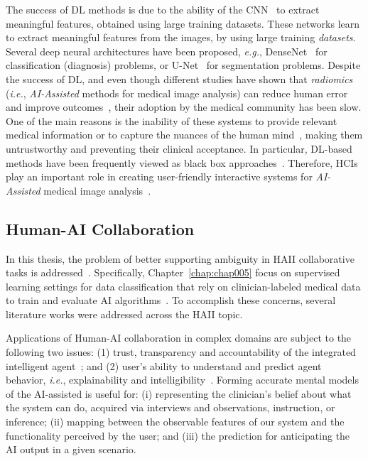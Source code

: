 The success of \ac{DL} methods is due to the ability of the \ac{CNN}~\cite{greenspan2016guest} to extract meaningful features, obtained using large training datasets.
These networks learn to extract meaningful features from the images, by using large training {\it datasets}. Several deep neural architectures have been proposed, {\it e.g.}, DenseNet~\cite{Huang_2017_CVPR} for classification (diagnosis) problems, or U-Net~\cite{ronneberger2015u} for segmentation problems.
Despite the success of DL, and even though different studies have shown that {\it radiomics} ({\it i.e.}, {\it AI-Assisted} methods for medical image analysis) can reduce human error and improve outcomes~\cite{Cai:2019:HTC:3290605.3300234,delvaux2017effects,middleton2016clinical}, their adoption by the medical community has been slow.
One of the main reasons is the inability of these systems to provide relevant medical information or to capture the nuances of the human mind~\cite{khairat2018reasons, kohli2018cad, 10.1145/2858036.2858373}, making them untrustworthy and preventing their clinical acceptance.
In particular, DL-based methods have been frequently viewed as black box approaches~\cite{litjens2017survey}.
Therefore, HCIs play an important role in creating user-friendly interactive systems for {\it AI-Assisted} medical image analysis~\cite{10.1145/3132272.3134111}.

\subsection{Human-AI Collaboration}
\label{sec:chap005002002}

In this thesis, the problem of better supporting ambiguity in \ac{HAII} collaborative tasks is addressed~\cite{10.1145/3313831.3376506}.
Specifically, Chapter~\ref{chap:chap005} focus on supervised learning settings for data classification that rely on clinician-labeled medical data to train and evaluate \ac{AI} algorithms~\cite{SchaekermannMike2020}.
To accomplish these concerns, several literature works were addressed across the \ac{HAII} topic.

Applications of Human-\ac{AI} collaboration in complex domains are subject to  the following two issues:
(1) trust, transparency and accountability of the integrated intelligent agent~\cite{10.1145/3290605.3300233}; and
(2) user's ability to understand and predict agent behavior, {\it i.e.}, explainability and intelligibility~\cite{Cai:2019:EEE:3301275.3302289, gunning2017explainable, miller2018explanation}.
Forming accurate mental models of the \ac{AI}-assisted is useful for:
(i) representing the clinician's belief about what the system can do, acquired via interviews and observations, instruction, or inference;
(ii) mapping between the observable features of our system and the functionality perceived by the user; and (iii) the prediction for anticipating the AI output in a given scenario.

